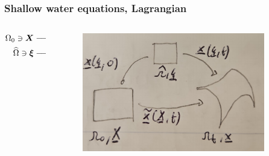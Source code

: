 \documentclass[pt12]{beamer}
\newcommand{\uvec}[2][3]{\boldsymbol{#2\mkern-#1mu}\mkern#1mu}
\begin{document}
\begin{frame}
\frametitle{Shallow water equations, Lagrangian}

    \begin{columns}
        \begin{column}{0.50\textwidth}
\begin{align*}
\Omega_0  \ni \uvec{X} \longrightarrow & ~ \uvec{x}=\widetilde{\uvec{x}}(\uvec{X},t) \in \Omega_t\\
\widehat{\Omega}  \ni \uvec{\xi} \longrightarrow & ~\uvec{x}=\uvec{x}(\uvec{\xi},t) \in \Omega_t\\
& \uvec{X}=\uvec{x}(\uvec{\xi},0)
\end{align*}
        \end{column}
        \begin{column}{0.50\textwidth}

\begin{figure}
         \centering
         \includegraphics[width=0.9\textwidth]{figures/lagrangian_maps.pdf}
\end{figure}
        \end{column}
    \end{columns}
\end{frame}
\end{document}
